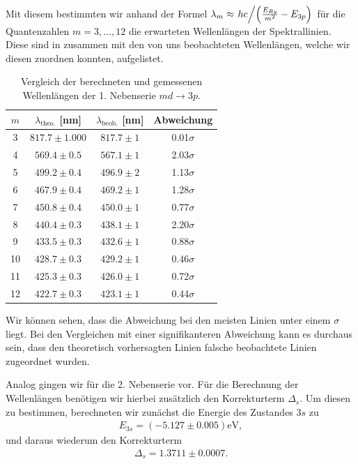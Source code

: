 Mit diesem bestimmten wir anhand der Formel $\lambda_m \approx \flatfrac{hc}{\qty(\frac{E_{Ry}}{m^2} - E_{3p})}$ für die Quantenzahlen $m=3,\dots,12$ die erwarteten Wellenlängen der Spektrallinien. Diese sind in  zusammen mit den von uns beobachteten Wellenlängen, welche wir diesen zuordnen konnten, aufgelistet.

\begin{table}[H]
  \centering
  \caption{Vergleich der berechneten und gemessenen Wellenlängen der 1. Nebenserie $md \to 3p$.}
  \vspace*{0.5em}
  \begin{tabular}{c c c c}
      \hline
      $m$ & $\lambda_{\text{theo.}}$ [nm] & $\lambda_{\text{beob.}}$ [nm] & Abweichung \\
      \hline
      3  & $817.7 \pm 1.000$ & $817.7 \pm 1$ & 0.01$\sigma$ \\
      4  & $569.4 \pm 0.5$ & $567.1 \pm 1$ & 2.03$\sigma$ \\
      5  & $499.2 \pm 0.4$ & $496.9 \pm 2$ & 1.13$\sigma$ \\
      6  & $467.9 \pm 0.4$ & $469.2 \pm 1$ & 1.28$\sigma$ \\
      7  & $450.8 \pm 0.4$ & $450.0 \pm 1$ & 0.77$\sigma$ \\
      8  & $440.4 \pm 0.3$ & $438.1 \pm 1$ & 2.20$\sigma$ \\
      9  & $433.5 \pm 0.3$ & $432.6 \pm 1$ & 0.88$\sigma$ \\
      10 & $428.7 \pm 0.3$ & $429.2 \pm 1$ & 0.46$\sigma$ \\
      11 & $425.3 \pm 0.3$ & $426.0 \pm 1$ & 0.72$\sigma$ \\
      12 & $422.7 \pm 0.3$ & $423.1 \pm 1$ & 0.44$\sigma$ \\
      \hline
  \end{tabular}
  \label{tab:wellenlaengen_1ns_zsmf}
\end{table}

Wir können sehen, dass die Abweichung bei den meisten Linien unter einem $\sigma$ liegt. Bei den Vergleichen mit einer signifikanteren Abweichung kann es durchaus sein, dass den theoretisch vorhersagten Linien falsche beobachtete Linien zugeordnet wurden.

Analog gingen wir für die 2. Nebenserie vor. Für die Berechnung der Wellenlängen benötigen wir hierbei zusätzlich den Korrekturterm $\Delta_s$. Um diesen zu bestimmen, berechneten wir zunächst die Energie des Zustandes $3s$ zu
\begin{align}
  E_{3s} = (-5.127 \pm 0.005)\si{\electronvolt},
\end{align}
und daraus wiederum den Korrekturterm
\begin{align}
  \Delta_s = 1.3711 \pm 0.0007.
\end{align}

